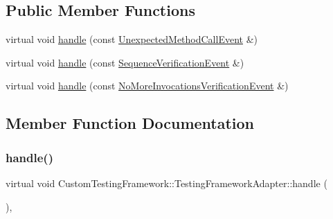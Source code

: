 \subsection*{Public Member Functions}
\begin{DoxyCompactItemize}
\item 
virtual void \mbox{\hyperlink{classCustomTestingFramework_1_1TestingFrameworkAdapter_a8ae7947d88f9d427d644ffbe2fb1b89b}{handle}} (const \mbox{\hyperlink{structfakeit_1_1UnexpectedMethodCallEvent}{Unexpected\+Method\+Call\+Event}} \&)
\item 
virtual void \mbox{\hyperlink{classCustomTestingFramework_1_1TestingFrameworkAdapter_af3a8d3a24116d36fff1dc495c84cfb2f}{handle}} (const \mbox{\hyperlink{structfakeit_1_1SequenceVerificationEvent}{Sequence\+Verification\+Event}} \&)
\item 
virtual void \mbox{\hyperlink{classCustomTestingFramework_1_1TestingFrameworkAdapter_a57f8533951a9dbe0e4bf013de72cf325}{handle}} (const \mbox{\hyperlink{structfakeit_1_1NoMoreInvocationsVerificationEvent}{No\+More\+Invocations\+Verification\+Event}} \&)
\end{DoxyCompactItemize}


\subsection{Member Function Documentation}
\mbox{\label{classCustomTestingFramework_1_1TestingFrameworkAdapter_a8ae7947d88f9d427d644ffbe2fb1b89b}} 
\subsubsection{\texorpdfstring{handle()}{handle()}\hspace{0.1cm}{\footnotesize\ttfamily [1/3]}}
{\footnotesize\ttfamily virtual void Custom\+Testing\+Framework\+::\+Testing\+Framework\+Adapter\+::handle (\begin{DoxyParamCaption}\item[{const \mbox{\hyperlink{structfakeit_1_1UnexpectedMethodCallEvent}{Unexpected\+Method\+Call\+Event}} \&}]{ }\end{DoxyParamCaption})\hspace{0.3cm}{\ttfamily [inline]}, {\ttfamily [virtual]}}



